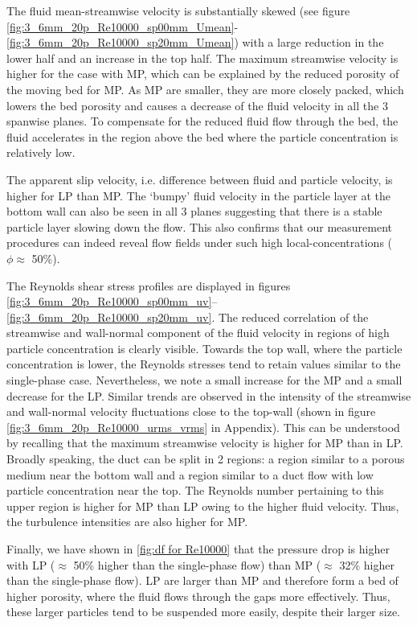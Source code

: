 \documentclass{jfm}
\begin{document}
The fluid mean-streamwise velocity is substantially skewed (see figure \ref{fig:3_6mm_20p_Re10000_sp00mm_Umean}-\ref{fig:3_6mm_20p_Re10000_sp20mm_Umean}) with a large reduction in the lower half and an increase in the top half. The maximum streamwise velocity is higher for the case with MP, which can be explained 
 by the reduced porosity of the moving bed for MP. As MP are smaller, they are more closely packed, which
 lowers the bed porosity and causes a decrease of the fluid velocity in all the 3 spanwise planes. To compensate for the reduced fluid flow through the bed, the fluid accelerates in the region above the bed where the particle concentration is relatively low.%


The apparent slip velocity, i.e. difference between fluid and particle velocity, is higher for LP than MP. The `bumpy' fluid velocity in the particle layer at the bottom wall can also be seen in all 3 planes suggesting that there is a stable particle layer slowing down the flow. This also confirms that our measurement procedures can indeed reveal flow fields under such high local-concentrations ($\phi\approx$ 50\%). 



The Reynolds shear stress profiles are displayed in figures \ref{fig:3_6mm_20p_Re10000_sp00mm_uv}--\ref{fig:3_6mm_20p_Re10000_sp20mm_uv}. The reduced correlation of the streamwise and wall-normal component of the fluid velocity in regions of high particle concentration is clearly visible. Towards the top wall, where the particle concentration is lower, the Reynolds stresses tend to retain values similar to the single-phase case. Nevertheless, we note a small increase for the MP and a small decrease for the LP. Similar trends are observed in the intensity of the streamwise and wall-normal velocity fluctuations close to the top-wall (shown in figure 
\ref{fig:3_6mm_20p_Re10000_urms_vrms} in Appendix). This can be understood by recalling that the maximum streamwise velocity is higher for MP than in LP. Broadly speaking, the duct can be split in 2 regions: a region similar to a porous medium near the bottom wall and a region similar to a duct flow with low particle concentration near the top. The Reynolds number pertaining to this upper region is higher for MP than LP owing to the higher fluid velocity. Thus, the turbulence intensities are also higher for MP.

Finally, we have shown in \ref{fig:df for Re10000} that the pressure drop is higher with LP ($\approx$ 50\% higher than the single-phase flow) than MP ($\approx$ 32\% higher than the single-phase flow). LP are larger than MP and therefore form a bed of higher porosity, where the fluid flows through the gaps more effectively. Thus, these larger particles tend to be suspended more easily, despite their larger size. 
\end{document}
